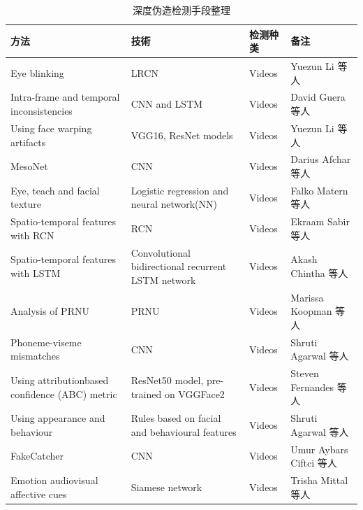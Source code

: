 
\begin{table}[ht]
  \caption{深度伪造检测手段整理}
  \label{Tab:bookRWCal}
  \centering
  \begin{tabular}{p{3cm}p{3cm}p{3cm}p{3cm}}
  \toprule
  \textbf{方法} &\textbf{技術} &\textbf{检测种类}&\textbf{备注}\\
  \midrule
 Eye blinking & LRCN & Videos & Yuezun Li 等人\\
 Intra-frame and temporal inconsistencies & CNN and LSTM & Videos & David Guera 等人\\
 Using face warping artifacts & VGG16, ResNet models & Videos & Yuezun Li 等人\\
 MesoNet & CNN & Videos & Darius Afchar 等人\\
 Eye, teach and facial texture & Logistic regression and neural network(NN) & Videos & Falko Matern 等人\\
 Spatio-temporal features with RCN & RCN & Videos & Ekraam Sabir 等人\\
 Spatio-temporal features with LSTM & Convolutional bidirectional recurrent LSTM network & Videos & Akash Chintha 等人\\
 Analysis of PRNU & PRNU & Videos & Marissa Koopman 等人\\
 Phoneme-viseme mismatches & CNN & Videos & Shruti Agarwal 等人\\
 Using attributionbased confidence (ABC) metric & ResNet50 model, pre-trained on VGGFace2 & Videos & Steven Fernandes 等人\\
 Using appearance and behaviour & Rules based on facial and behavioural features & Videos &  Shruti Agarwal 等人\\
 FakeCatcher & CNN & Videos & Umur Aybars Ciftci 等人\\
 Emotion audiovisual affective cues & Siamese network & Videos & Trisha Mittal 等人\\
  \bottomrule
  \end{tabular}
\end{table}

